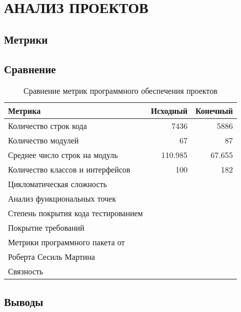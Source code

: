 \section{АНАЛИЗ ПРОЕКТОВ}
    \subsection{Метрики}

    \subsection{Сравнение}
    
    \begin{table}[!h]
        \caption{Сравнение метрик программного обеспечения проектов}
        \begin{center}
            \begin{tabular}{l|r|r}
                \textbf{Метрика} & \textbf{Исходный} & \textbf{Конечный} \\
                \hline
                Количество строк кода               & 7436 & 5886 \\
                Количество модулей                  & 67 & 87 \\
                Среднее число строк на модуль       & 110.985 & 67.655 \\
                Количество классов и интерфейсов    & 100 & 182 \\
                Цикломатическая сложность           & & \\
                Анализ функциональных точек         & & \\
                Степень покрытия кода тестированием & & \\
                Покрытие требований                 & & \\
                Метрики программного пакета от      & & \\
                Роберта Сесиль Мартина              & & \\
                Связность                           & & \\
            \end{tabular}
        \end{center}
    \end{table}

    \subsection{Выводы}
